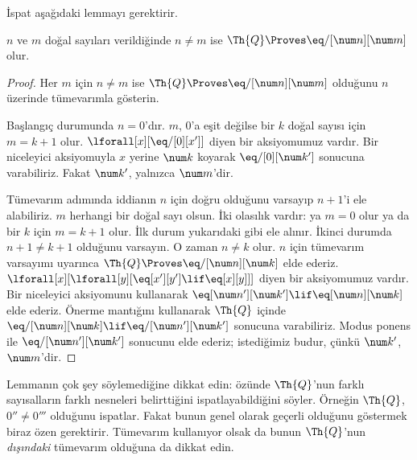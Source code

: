 \documentclass[../../../include/open-logic-section]{subfiles}
\begin{document}
İspat aşağıdaki lemmayı gerektirir.

\begin{lem}
 $n$ ve $m$ doğal sayıları verildiğinde $n\neq m$
ise $\Th{Q} \Proves \eq/[\num n][\num m]$ olur.
\end{lem}

\begin{proof}
Her $m$ için $n\neq m$ ise $\Th{Q} \Proves \eq/[\num n][\num m]$ olduğunu
$n$ üzerinde tümevarımla gösterin.

Başlangıç durumunda $n=0$'dır. $m$, $0$'a eşit değilse bir $k$ doğal sayısı
için $m=k+1$ olur. $\lforall[x][\eq/[0][x']]$ diyen bir aksiyomumuz vardır.
Bir niceleyici aksiyomuyla $x$ yerine $\num k$ koyarak
$\eq/[0][\num k']$ sonucuna varabiliriz. Fakat $\num k'$, yalnızca
$\num m$'dir.

Tümevarım adımında iddianın $n$ için doğru olduğunu varsayıp $n+1$'i ele
alabiliriz. $m$ herhangi bir doğal sayı olsun. İki olasılık vardır: ya $m=0$
olur ya da bir $k$ için $m=k+1$ olur. İlk durum yukarıdaki gibi ele alınır.
İkinci durumda $n+1\neq k+1$ olduğunu varsayın. O zaman $n\neq k$ olur.
$n$ için tümevarım varsayımı uyarınca
$\Th{Q} \Proves \eq/[\num n][\num k]$ elde ederiz.
$\lforall[x][\lforall[y][\eq[x'][y'] \lif \eq[x][y]]]$ diyen bir
aksiyomumuz vardır. Bir niceleyici aksiyomunu kullanarak
$\eq[\num n'][\num k'] \lif \eq[\num n][\num k]$ elde ederiz. Önerme
mantığını kullanarak $\Th{Q}$ içinde
$\eq/[\num n][\num k] \lif \eq/[\num n'][\num k']$ sonucuna varabiliriz.
Modus ponens ile $\eq/[\num n'][\num k']$ sonucunu elde ederiz; istediğimiz
budur, çünkü $\num k'$, $\num m$'dir.
\end{proof}

\begin{explain}
Lemmanın çok şey söylemediğine dikkat edin: özünde $\Th{Q}$'nun farklı
sayısalların farklı nesneleri belirttiğini ispatlayabildiğini söyler.
Örneğin $\Th{Q}$, $0''\neq0'''$ olduğunu ispatlar. Fakat bunun genel olarak
geçerli olduğunu göstermek biraz özen gerektirir. Tümevarım kullanıyor olsak
da bunun $\Th{Q}$'nun \emph{dışındaki} tümevarım olduğuna da dikkat edin.
\end{explain}
\end{document}
